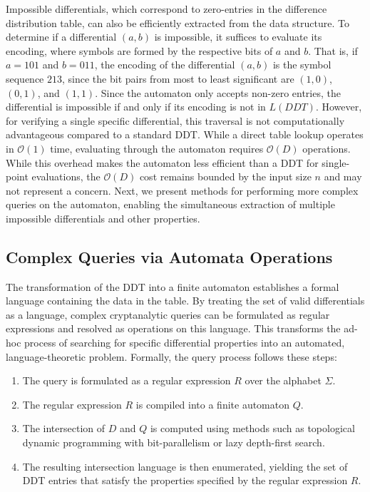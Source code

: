 Impossible differentials, which correspond to zero-entries in the difference distribution table, can also be efficiently extracted from the data structure. To determine if a differential $(a, b)$ is impossible, it suffices to evaluate its encoding, where symbols are formed by the respective bits of $a$ and $b$. That is, if $a = 101$ and $b = 011$, the encoding of the differential $(a, b)$ is the symbol sequence $213$, since the bit pairs from most to least significant are $(1,0)$, $(0,1)$, and $(1,1)$. Since the automaton only accepts non-zero entries, the differential is impossible if and only if its encoding is not in $L(DDT)$. However, for verifying a single specific differential, this traversal is not computationally advantageous compared to a standard DDT. While a direct table lookup operates in $\mathcal{O}(1)$ time, evaluating through the automaton requires $\mathcal{O}(D)$ operations. While this overhead makes the automaton less efficient than a DDT for single-point evaluations, the $\mathcal{O}(D)$ cost remains bounded by the input size $n$ and may not represent a concern. Next, we present methods for performing more complex queries on the automaton, enabling the simultaneous extraction of multiple impossible differentials and other properties.

\subsection{Complex Queries via Automata Operations}
\label{sec:queries}

The transformation of the DDT into a finite automaton establishes a formal
language containing the data in the table. By treating the set of valid
differentials as a language, complex cryptanalytic queries can be
formulated as regular expressions and resolved as operations on this
language. This transforms the ad-hoc process of searching for specific
differential properties into an automated, language-theoretic problem.
Formally, the query process follows these steps:
\begin{enumerate}
    \item The query is formulated as a regular expression $R$ over the
          alphabet $\Sigma$.
    \item The regular expression $R$ is compiled into a finite automaton
          $Q$.
    \item The intersection of $D$ and $Q$ is computed using methods such
          as topological dynamic programming with bit-parallelism or lazy
          depth-first search.
    \item The resulting intersection language is then enumerated, yielding
          the set of DDT entries that satisfy the properties specified by
          the regular expression $R$.
\end{enumerate}

